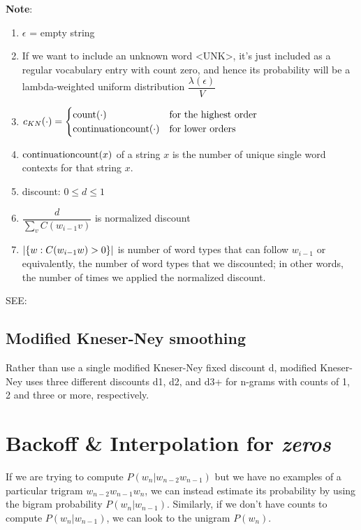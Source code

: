 \textbf{Note}:

\begin{enumerate}[itemsep=0.1cm]
    \item $\epsilon$ = empty string
    \item If we want to include an unknown word <UNK>, it’s just included as a regular vocabulary entry with count zero, and hence its probability will be a lambda-weighted uniform distribution \(\dfrac{\lambda(\epsilon)}{V}\)
    \item \(c_{KN}(\cdot) = \begin{cases}
        \operatorname{count}(\cdot) & \text{for the highest order} \\
        \operatorname{continuationcount}(\cdot) & \text{for lower orders}
    \end{cases}\)
    \item $\operatorname{continuationcount}(x)$ of a string $x$ is the number of unique single word contexts for that string $x$.
    \item discount: $0 \leq d \leq 1$ 
    \item \(\dfrac{d}{\sum_v C(w_{i-1}v)}\) is normalized discount
    \item \(\left| \left\{w : C(w_{i-1}w) > 0\right\} \right|\) is number of word types that can follow $w_{i-1}$ or equivalently, the number of word types that we discounted; in other words, the number of times we applied the normalized discount.
\end{enumerate}

\vspace{0.2cm}

SEE: 

\subsection{Modified Kneser-Ney smoothing}
Rather than use a single modified
Kneser-Ney fixed discount d, modified Kneser-Ney uses three different discounts d1, d2, and d3+ for n-grams with counts of 1, 2 and three or more, respectively.

\section{Backoff \& Interpolation for \textit{zeros} \cite{nlp-1}}
If we are trying to compute $P(w_n|w_{n-2}w_{n-1})$ but we have no examples of a particular trigram $w_{n-2}w_{n-1}w_n$, we can instead estimate its probability by using the bigram probability $P(w_n|w_{n-1})$. Similarly, if we don’t have counts to compute $P(w_n|w_{n-1})$, we can look to the unigram $P(w_n)$.

